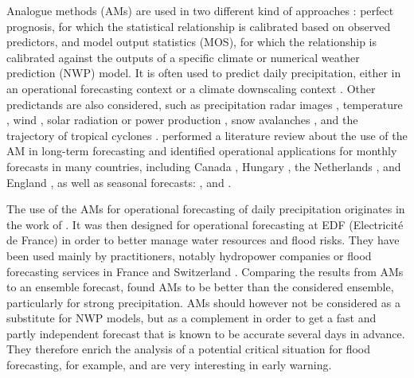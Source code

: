 \documentclass[review]{elsarticle}
\begin{document}
Analogue methods (AMs) are used in two different kind of approaches \citep{Rummukainen1997}: perfect prognosis, for which the statistical relationship is calibrated based on observed predictors, and model output statistics (MOS), for which the relationship is calibrated against the outputs of a specific climate or numerical weather prediction (NWP) model. It is often used to predict daily precipitation, either in an operational forecasting context \citep[e.g.][]{Guilbaud1997, Bontron2005, Hamill2006, Bliefernicht2010, Marty2012, Horton2012, Hamill2015, BenDaoud2016} or a climate downscaling context \citep[e.g.][]{Radanovics2013, Chardon2014, Dayon2015, Raynaud2016b}. Other predictands are also considered, such as precipitation radar images \citep{Panziera2011,Foresti2015a}, temperature \citep{Radinovic1975, Woodcock1980, Kruizinga1983, DelleMonache2013, Caillouet2016, Raynaud2016b}, wind \citep{Gordon1987, DelleMonache2013, DelleMonache2011, Vanvyve2015, Alessandrini2015, Junk2015, Junk2015c}, solar radiation or power production \citep{Alessandrini2015a, Bessa2015, Raynaud2016b}, snow avalanches \citep{Obled1980, Bolognesi1993}, and the trajectory of tropical cyclones \citep{Keenan1981, Sievers2000, Fraedrich2003}. \citet{Guilbaud1997} performed a literature review about the use of the AM in long-term forecasting and identified operational applications for monthly forecasts in many countries, including Canada \citep{Shabbar1986},  Hungary \citep{Toth1989}, the Netherlands \citep{Nap1981}, and England \citep{Murray1974}, as well as seasonal forecasts: \citet{Barnett1978}, \citet{Bergen1982} and \citet{Livezey1988}.

The use of the AMs for operational forecasting of daily precipitation originates in the work of \citet{Duband1970, Duband1974, Duband1981}. It was then designed for operational forecasting at EDF (Electricit\'{e} de France) in order to better manage water resources and flood risks. They have been used mainly by practitioners, notably hydropower companies \citep{Desaint2008a,BenDaoud2009,Obled2014} or flood forecasting services in France and Switzerland \citep{Marty2010,GarciaHernandez2009b,Horton2012}. Comparing the results from AMs to an ensemble forecast, \citet{Marty2010} found AMs to be better than the considered ensemble, particularly for strong precipitation. AMs should however not be considered as a substitute for NWP models, but as a complement in order to get a fast and partly independent forecast that is known to be accurate several days in advance. They therefore enrich the analysis of a potential critical situation for flood forecasting, for example, and are very interesting in early warning.
\end{document}
